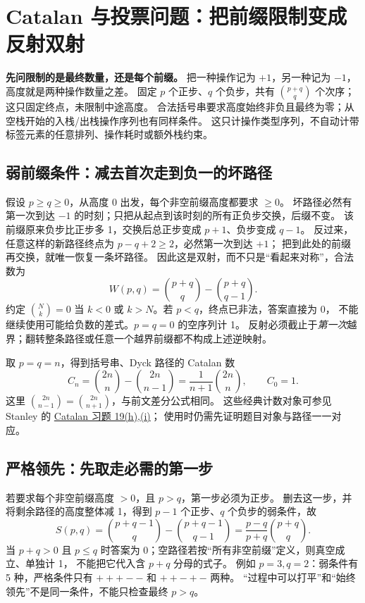 \section{Catalan 与投票问题：把前缀限制变成反射双射}\label{knowledge-ballot-reflection}
\textbf{先问限制的是最终数量，还是每个前缀。}
把一种操作记为 $+1$，另一种记为 $-1$，高度就是两种操作数量之差。
固定 $p$ 个正步、$q$ 个负步，共有 $\binom{p+q}{q}$ 个次序；这只固定终点，未限制中途高度。
合法括号串要求高度始终非负且最终为零；从空栈开始的入栈/出栈操作序列也有同样条件。
这只计操作类型序列，不自动计带标签元素的任意排列、操作耗时或额外栈约束。

\subsection{弱前缀条件：减去首次走到负一的坏路径}
假设 $p\ge q\ge0$，从高度 0 出发，每个非空前缀高度都要求 $\ge0$。
坏路径必然有第一次到达 $-1$ 的时刻；只把从起点到该时刻的所有正负步交换，后缀不变。
该前缀原来负步比正步多 1，交换后总正步变成 $p+1$、负步变成 $q-1$。
反过来，任意这样的新路径终点为 $p-q+2\ge2$，必然第一次到达 $+1$；
把到此处的前缀再交换，就唯一恢复一条坏路径。
因此这是双射，而不只是“看起来对称”，合法数为
\[
W(p,q)=\binom{p+q}{q}-\binom{p+q}{q-1}.
\]
约定 $\binom Nk=0$ 当 $k<0$ 或 $k>N$。若 $p<q$，终点已非法，答案直接为 0，
不能继续使用可能给负数的差式。$p=q=0$ 的空序列计 1。
反射必须截止于\emph{第一次}越界；翻转整条路径或任意一个越界前缀都不构成上述逆映射。

取 $p=q=n$，得到括号串、Dyck 路径的 Catalan 数
\[
C_n=\binom{2n}{n}-\binom{2n}{n-1}
   =\frac1{n+1}\binom{2n}{n},\qquad C_0=1.
\]
这里 $\binom{2n}{n-1}=\binom{2n}{n+1}$，与前文差分公式相同。
这些经典计数对象可参见 Stanley 的
\href{https://math.mit.edu/~rstan/ec/catalan.pdf}{Catalan 习题 19(h),(i)}；
使用时仍需先证明题目对象与路径一一对应。

\subsection{严格领先：先取走必需的第一步}
若要求每个非空前缀高度 $>0$，且 $p>q$，第一步必须为正步。
删去这一步，并将剩余路径的高度整体减 1，得到 $p-1$ 个正步、$q$ 个负步的弱条件，故
\[
S(p,q)=\binom{p+q-1}{q}-\binom{p+q-1}{q-1}
      =\frac{p-q}{p+q}\binom{p+q}{q}.
\]
当 $p+q>0$ 且 $p\le q$ 时答案为 0；空路径若按“所有非空前缀”定义，则真空成立、单独计 1，
不能把它代入含 $p+q$ 分母的式子。
例如 $p=3,q=2$：弱条件有 5 种，严格条件只有 $+++--$ 和 $++-+-$ 两种。
“过程中可以打平”和“始终领先”不是同一条件，不能只检查最终 $p>q$。

